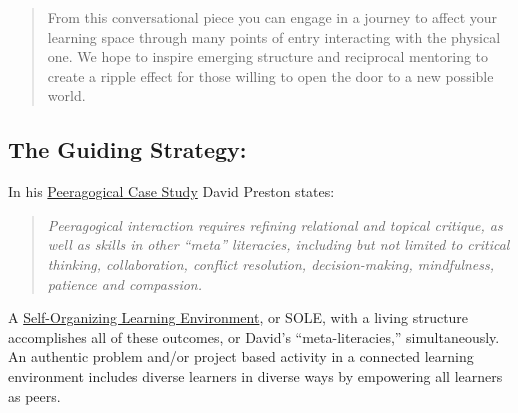 
\begin{quote}
From this conversational piece you can engage in a journey to affect
your learning space through many points of entry interacting with the
physical one.  We hope to inspire emerging structure and reciprocal
mentoring to create a ripple effect for those willing to open the door
to a new possible world.
\end{quote}

\subsection{The Guiding Strategy:}

In his \href{http://peeragogy.org/case-study-5ph1nx/}{Peeragogical Case
Study} David Preston states:

\begin{quote}
\emph{Peeragogical interaction requires refining relational and topical
critique, as well as skills in other ``meta'' literacies, including but
not limited to critical thinking, collaboration, conflict resolution,
decision-making, mindfulness, patience and compassion.} 
\end{quote}

A
\href{http://en.wikipedia.org/wiki/Self\_Organised\_Learning\_Environment}{Self-Organizing
Learning Environment}, or SOLE, with a living structure accomplishes all
of these outcomes, or David's ``meta-literacies,'' simultaneously.
An authentic problem and/or project based activity in a
connected learning environment includes diverse learners in diverse ways
by empowering all learners as peers.

